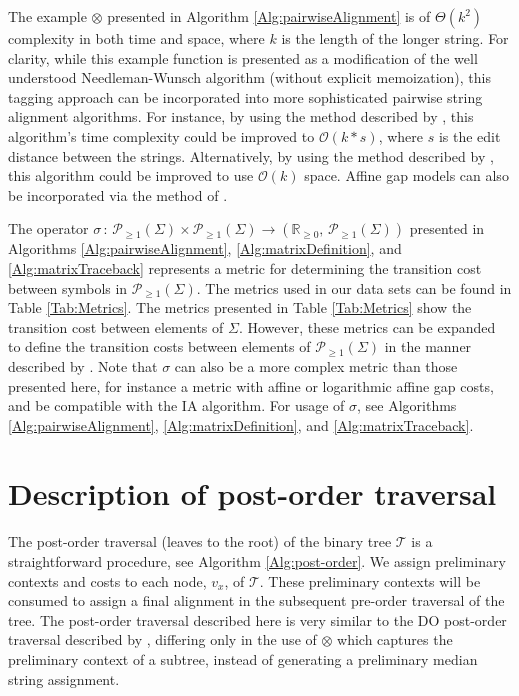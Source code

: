 \documentclass{bmcart}
\newcommand*\NEPowerset{\mathcal{P}_{\geq 1}}
\newcommand*\NonNegReals{\mathbb{R}_{\geq 0}}
\begin{document}
The example $\otimes$ presented in Algorithm \ref{Alg:pairwiseAlignment} is of $\Theta\left( k^2 \right)$ complexity in both time and space, where $k$ is the length of the longer string.
For clarity, while this example function is presented as a modification of the well understood Needleman-Wunsch algorithm (without explicit memoization), this tagging approach can be incorporated into more sophisticated pairwise string alignment algorithms.
For instance, by using the method described by \cite{Ukkonen1985100}, this algorithm's time complexity could be improved to $\mathcal{O}\left( k * s \right)$, where $s$ is the edit distance between the strings. 
Alternatively, by using the method described by \cite{Hirschberg1975}, this algorithm could be improved to use $\mathcal{O}\left( k \right)$ space.
Affine gap models \cite{Gotoh1982} can also be incorporated via the method of \cite{VaronandWheeler2012}.

The operator $\sigma \,:\, \NEPowerset(\Sigma) \times \NEPowerset(\Sigma) \rightarrow \left(\NonNegReals,\, \NEPowerset(\Sigma) \right)$ presented in Algorithms \ref{Alg:pairwiseAlignment}, \ref{Alg:matrixDefinition}, and \ref{Alg:matrixTraceback} represents a metric for determining the transition cost between symbols in $\NEPowerset (\Sigma)$.
The metrics used in our data sets can be found in Table \ref{Tab:Metrics}. 
The metrics presented in Table \ref{Tab:Metrics} show the transition cost between elements of $\Sigma$.
However, these metrics can be expanded to define the transition costs between elements of $\NEPowerset(\Sigma)$ in the manner described by \cite{VaronandWheeler2012}.
Note that $\sigma$ can also be a more complex metric than those presented here, for instance a metric with affine or logarithmic affine gap costs, and be compatible with the IA algorithm. For usage of $\sigma$, see Algorithms \ref{Alg:pairwiseAlignment}, \ref{Alg:matrixDefinition}, and \ref{Alg:matrixTraceback}.


\section*{Description of post-order traversal}

The post-order traversal (leaves to the root) of the binary tree $\mathcal{T}$ is a straightforward procedure, see Algorithm \ref{Alg:post-order}.
We assign preliminary contexts and costs to each node, $v_x$, of $\mathcal{T}$.
These preliminary contexts will be consumed to assign a final alignment in the subsequent pre-order traversal of the tree.
The post-order traversal described here is very similar to the DO post-order traversal described by \cite{Wheeler2003}, differing only in the use of $\otimes$ which captures the preliminary context of a subtree, instead of generating a preliminary median string assignment.
\end{document}
